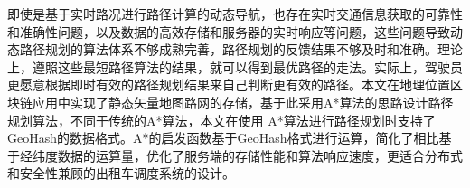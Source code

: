 即使是基于实时路况进行路径计算的动态导航，也存在实时交通信息获取的可靠性和准确性问题，以及数据的高效存储和服务器的实时响应等问题，这些问题导致动态路径规划的算法体系不够成熟完善，路径规划的反馈结果不够及时和准确。理论上，遵照这些最短路径算法的结果，就可以得到最优路径的走法。实际上，驾驶员更愿意根据即时有效的路径规划结果来自己判断更有效的路径。本文在地理位置区块链应用中实现了静态矢量地图路网的存储，基于此采用A*算法的思路设计路径规划算法，不同于传统的A*算法，本文在使用 A*算法进行路径规划时支持了GeoHash的数据格式。A*的启发函数基于GeoHash格式进行运算，简化了相比基于经纬度数据的运算量，优化了服务端的存储性能和算法响应速度，更适合分布式和安全性兼顾的出租车调度系统的设计。



